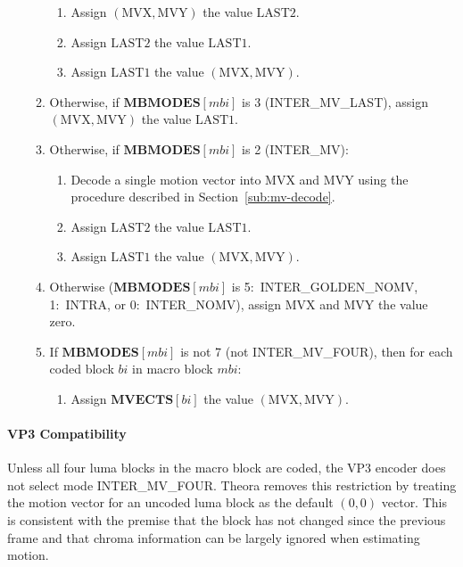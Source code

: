 \documentclass[9pt,letterpaper]{book}
\newcommand{\idx}[1]{{\ensuremath{\mathit{#1}}}}
\newcommand{\bi}{\idx{bi}}
\newcommand{\mbi}{\idx{mbi}}
\newcommand{\bitvar}[1]{\ensuremath{\mathbf{\bm{#1}}}}
\newcommand{\locvar}[1]{\ensuremath{\mathrm{#1}}}
\numberwithin{equation}{chapter}
\numberwithin{figure}{chapter}
\numberwithin{table}{chapter}
\begin{document}
\begin{enumerate}
\begin{enumerate}
\begin{enumerate}
\item
Assign $(\locvar{MVX},\locvar{MVY})$ the value \locvar{LAST2}.
\item
Assign \locvar{LAST2} the value \locvar{LAST1}.
\item
Assign \locvar{LAST1} the value $(\locvar{MVX},\locvar{MVY})$.
\end{enumerate}
\item
Otherwise, if $\bitvar{MBMODES}[\locvar{\mbi}]$ is 3 (INTER\_MV\_LAST), assign
 $(\locvar{MVX},\locvar{MVY})$ the value \locvar{LAST1}.
\item
Otherwise, if $\bitvar{MBMODES}[\locvar{\mbi}]$ is 2 (INTER\_MV):
\begin{enumerate}
\item
Decode a single motion vector into \locvar{MVX} and \locvar{MVY} using the
 procedure described in Section~\ref{sub:mv-decode}.
\item
Assign \locvar{LAST2} the value \locvar{LAST1}.
\item
Assign \locvar{LAST1} the value $(\locvar{MVX},\locvar{MVY})$.
\end{enumerate}
\item
Otherwise ($\bitvar{MBMODES}[\locvar{\mbi}]$ is 5:~INTER\_GOLDEN\_NOMV,
 1:~INTRA, or 0:~INTER\_NOMV), assign \locvar{MVX} and \locvar{MVY} the value
 zero.
\item
If $\bitvar{MBMODES}[\locvar{\mbi}]$ is not 7 (not INTER\_MV\_FOUR), then for
 each coded block \locvar{\bi} in macro block \locvar{\mbi}:
\begin{enumerate}
\item
Assign $\bitvar{MVECTS}[\locvar{\bi}]$ the value $(\locvar{MVX},\locvar{MVY})$.
\end{enumerate}
\end{enumerate}
\end{enumerate}

\paragraph{VP3 Compatibility}

Unless all four luma blocks in the macro block are coded, the VP3 encoder does
 not select mode INTER\_MV\_FOUR.
Theora removes this restriction by treating the motion vector for an uncoded
 luma block as the default $(0,0)$ vector.
This is consistent with the premise that the block has not changed since the
 previous frame and that chroma information can be largely ignored when
 estimating motion.
\end{document}
